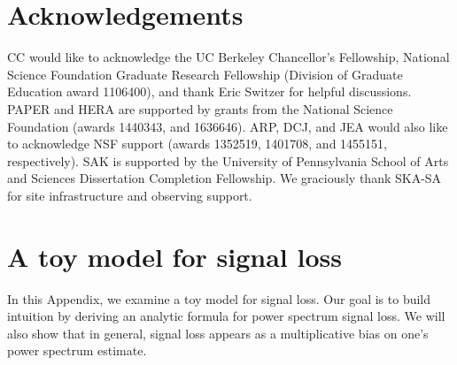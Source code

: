 \documentclass[preprint2,numberedappendix,tighten]{aastex6}  %
\begin{document}

\section{Acknowledgements}
CC would like to acknowledge the UC Berkeley Chancellor's Fellowship, National Science Foundation Graduate Research 
Fellowship (Division of Graduate Education award 1106400), and thank Eric Switzer for helpful discussions. PAPER and HERA 
are supported by grants from the National Science Foundation (awards 1440343, and 1636646). ARP, DCJ, and JEA would 
also like to acknowledge NSF support (awards 1352519, 1401708, and 1455151, respectively). SAK is supported by the University of Pennsylvania School of Arts and Sciences Dissertation Completion Fellowship. We graciously thank SKA-SA for site infrastructure and observing support.
\label{sec:Ack}


\appendix
\section{A toy model for signal loss}
\label{sec:sigloss_appendix}

In this Appendix, we examine a toy model for signal loss. Our goal is to build intuition by deriving an analytic formula for power spectrum signal loss. We will also show that in general, signal loss appears as a multiplicative bias on one's power spectrum estimate.
\end{document}
